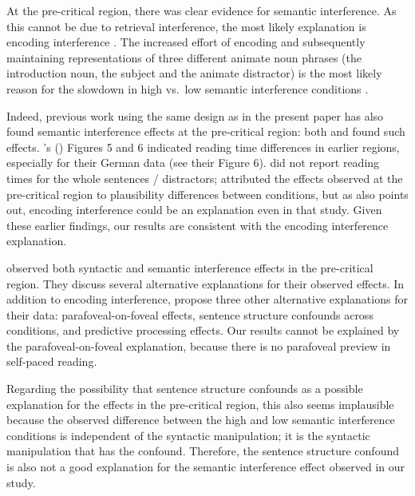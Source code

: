 \documentclass[a4paper, man, floatsintext]{apa7}
\begin{document}
At the pre-critical region, there was clear evidence for semantic interference. As this cannot be due to retrieval interference, the most likely explanation is encoding interference \citep{Oberauer_Kliegl_2006}. The increased effort of encoding and subsequently maintaining representations of three different animate noun phrases (the introduction noun, the subject and the animate distractor) is the most likely reason for the slowdown in high vs.\ low semantic interference conditions \citep[for similar findings, see e.g., ][]{lago_etal_2021, ness2019, ness2017, kush_etal_2015, gordon02}. 

Indeed, previous work using the same design as in the present paper has also found semantic interference effects at the pre-critical region: both \textcite{vandyke07} and \textcite{mertzen} found such effects. \citeauthor{mertzen}'s (\citeyear{mertzen}) Figures 5 and 6 indicated reading time differences in earlier regions, especially for their German data (see their Figure 6). \textcite{vandyke07} did not report reading times for the whole sentences / distractors;  \citeauthor{vandyke07} attributed the effects observed at the pre-critical region to plausibility differences between conditions, but as \textcite{mertzen} also points out, encoding interference could be an explanation even in that study. Given these earlier findings, our results are consistent with the encoding interference explanation.

\textcite{mertzen} observed both syntactic and semantic interference effects in the pre-critical region. 
They discuss several alternative explanations for their observed effects. In addition to encoding interference, \textcite{mertzen} propose three other alternative explanations for their data: parafoveal-on-foveal effects, sentence structure confounds across conditions, and predictive processing effects. Our results cannot be explained by the parafoveal-on-foveal explanation, because there is no parafoveal preview in self-paced reading. 

Regarding the possibility that sentence structure confounds as a possible explanation for the effects in the pre-critical region, this also seems implausible because the observed difference between the high and low semantic interference conditions is independent of the syntactic manipulation; it is the syntactic manipulation that has the confound. Therefore, the sentence structure confound is also not a good explanation for the semantic interference effect observed in our study. 
\end{document}
